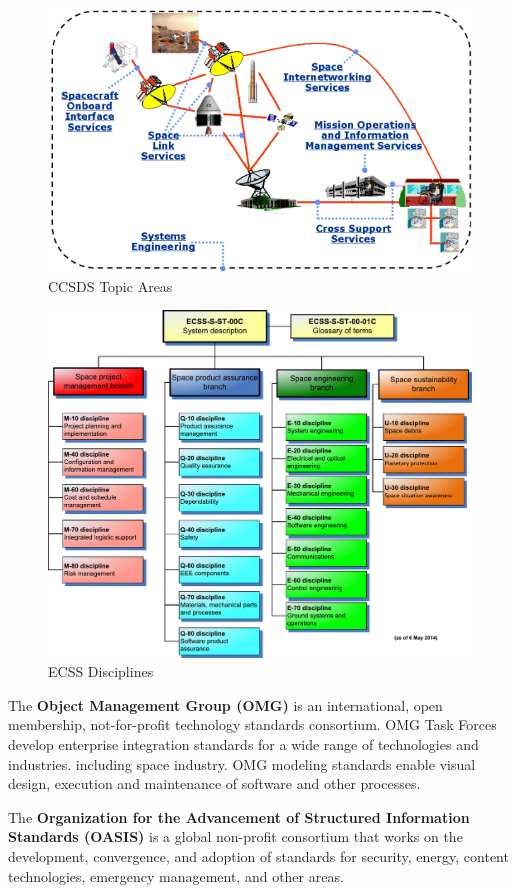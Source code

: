 \begin{figure}[h]
\centering\includegraphics[scale=0.6]{fig/ccsds_topic_areas}
\caption{CCSDS Topic Areas}
\label{fig:CCSDS Topic Areas}
\end{figure}

\begin{figure}[h]
\centering\includegraphics[scale=0.38]{fig/ecss_disciplines}
\caption{ECSS Disciplines}
\label{fig:ECSS Disciplines}
\end{figure}

The \textbf{Object Management Group (OMG)} \cite{omg.org} is an international, open membership, not-for-profit technology standards consortium. OMG Task Forces develop enterprise integration standards for a wide range of technologies and industries. including space industry. OMG modeling standards enable visual design, execution and maintenance of software and other processes. 

The \textbf{Organization for the Advancement of Structured Information Standards (OASIS)} \cite{oasis.org} is a global non-profit consortium that works on the development, convergence, and adoption of standards for security, energy, content technologies, emergency management, and other areas.
